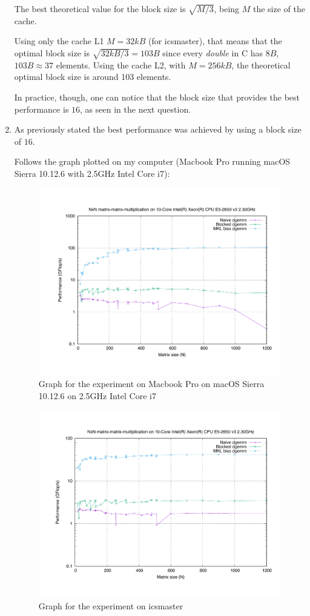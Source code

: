 \documentclass[unicode,11pt,a4paper,oneside,numbers=endperiod,openany]{scrartcl}
\begin{document}
\begin{enumerate}
            The best theoretical value for the block size is $\sqrt{M/3}$, being $M$ the size of the cache.

            Using only the cache L1 $M = 32kB$ (for icsmaster), that means that the optimal block size is $\sqrt{32kB/3} = 103B$ since every \textit{double} in C has $8B$, $103B \approx 37$ elements.
            Using the cache L2, with $M = 256kB$, the theoretical optimal block size is around 103 elements.

            In practice, though, one can notice that the block size that provides the best performance is $16$, as seen in the next question.


        \item 
            As previously stated the best performance was achieved by using a block size of $16$.

            Follows the graph plotted on my computer (Macbook Pro running macOS Sierra 10.12.6 with 2.5GHz Intel Core i7):

            \begin{figure}[H]
                \includegraphics[width=.8\linewidth]{timing_mac}
                \caption{Graph for the experiment on Macbook Pro on macOS Sierra 10.12.6 on 2.5GHz Intel Core i7}
            \end{figure}

            \begin{figure}[H]
                \includegraphics[width=.8\linewidth]{timing_icsmaster}
                \caption{Graph for the experiment on icsmaster}
            \end{figure}



\end{enumerate}
\end{document}
